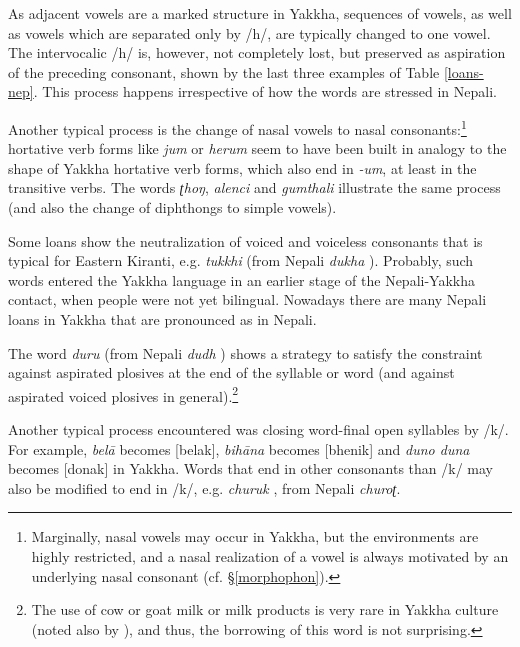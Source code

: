 As adjacent vowels are a marked structure in Yakkha, sequences of vowels, as well as  vowels which are separated only by /h/, are typically changed to one vowel. The intervocalic /h/ is, however, not completely lost, but preserved as aspiration of the preceding consonant, shown by the last three examples of Table \ref{loans-nep}. This process  happens irrespective of how the words are stressed in Nepali.

 Another typical process is the change of nasal vowels to nasal consonants:\footnote{Marginally, nasal vowels may occur in Yakkha, but the environments are highly restricted, and a nasal realization of a vowel is always motivated by an underlying nasal consonant (cf. §\ref{morphophon}).}  hortative verb forms like  \emph{jum}  or \emph{herum}  seem to have been built in analogy to the shape of Yakkha hortative verb forms, which also end in \emph{-um}, at least in the transitive verbs. The words  \emph{ʈhoŋ}, \emph{alenci} and \emph{gumthali} illustrate the same process (and also the change of diphthongs to simple vowels). 
 
Some loans show the neutralization of voiced and voiceless consonants that is typical for Eastern Kiranti, e.g. \emph{tukkhi} (from Nepali \emph{dukha} ). Probably, such  words entered the Yakkha language in an earlier stage of the Nepali-Yakkha contact, when people were not yet bilingual. Nowadays there are many Nepali loans in Yakkha that are pronounced as in Nepali. 
 
 The word \emph{duru} (from Nepali \emph{dudh} ) shows a strategy to satisfy the constraint against aspirated plosives at the end of the syllable or word (and against aspirated voiced plosives in general).\footnote{The use of cow or goat milk or milk products is very rare in Yakkha culture (noted also by \citealt[128-30]{Russell1992_Yakha}), and thus, the borrowing of this word is not surprising.} 
 
 Another typical process  encountered was closing word-final open syllables by /k/. For example, \emph{belā}   becomes [belak], \emph{bihāna}   becomes [bhenik] and \emph{duno \ti duna}  becomes [donak] in Yakkha. Words that end in other consonants than /k/ may also be modified to end in /k/, e.g. \emph{churuk} , from Nepali \emph{churoʈ}.

